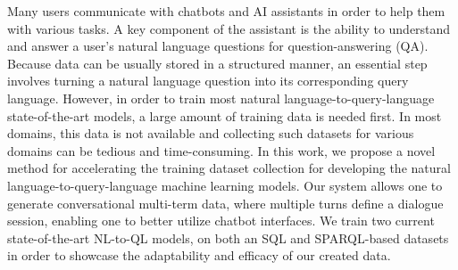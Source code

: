 Many users communicate with chatbots and AI assistants in order to help them with various tasks. A key component of the assistant is the ability to understand and answer a user's natural language questions for question-answering (QA). Because data can be usually stored in a structured manner, an essential step involves turning a natural language question into its corresponding query language.  However, in order to train most natural language-to-query-language state-of-the-art models, a large amount of training data is needed first. In most domains, this data is not available and collecting such datasets for various domains can be tedious and time-consuming. In this work, we propose a novel method for accelerating the training dataset collection for developing the natural language-to-query-language machine learning models. Our system allows one to generate conversational multi-term data, where multiple turns define a dialogue session, enabling one to better utilize chatbot interfaces. We train two current state-of-the-art NL-to-QL models, on both an SQL and SPARQL-based datasets in order to showcase the adaptability and efficacy of our created data.
